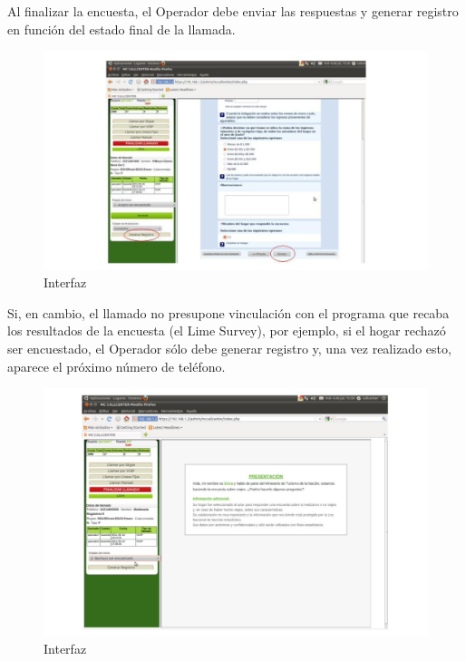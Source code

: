 \documentclass[
  openany]{book}
\begin{document}
Al finalizar la encuesta, el Operador debe enviar las respuestas y generar registro en función del estado final de la llamada.

\begin{figure}

{\centering \includegraphics[width=1\linewidth]{imagenes/figura6-17} 

}

\caption{Interfaz}\label{fig:In}
\end{figure}

Si, en cambio, el llamado no presupone vinculación con el programa que recaba los resultados de la encuesta (el Lime Survey), por ejemplo, si el hogar rechazó ser encuestado, el Operador sólo debe generar registro y, una vez realizado esto, aparece el próximo número de teléfono.

\begin{figure}

{\centering \includegraphics[width=1\linewidth]{imagenes/figura6-18} 

}

\caption{Interfaz}\label{fig:I}
\end{figure}
\end{document}
